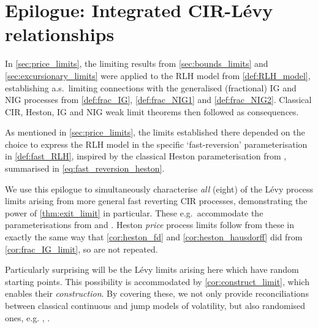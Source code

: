 \clearpage

\section*{\hypertarget{epilogue}{Epilogue: Integrated CIR-L\'evy relationships}}
\renewcommand\thesubsection{\thesection\Alph{subsection}}

\pagestyle{fancy}
\fancyhf{}
\renewcommand{\headrulewidth}{0pt}
\cfoot{\thepage}

In \autoref{sec:price_limits}, the limiting results from \autoref{sec:bounds_limits} and \autoref{sec:excursionary_limits} were applied to the RLH model from \autoref{def:RLH_model}, establishing a.s.~limiting connections with the generalised (fractional) IG and NIG processes from \autoref{def:frac_IG}, \autoref{def:frac_NIG1} and \autoref{def:frac_NIG2}. Classical CIR, Heston, IG and NIG weak limit theorems then followed as consequences.

As mentioned in \autoref{sec:price_limits}, the limits established there depended on the choice to express the RLH model in the specific `fast-reversion' parameterisation in \autoref{def:fast_RLH}, inspired by the classical Heston parameterisation from \cite{mechkov_2015}, summarised in \autoref{eq:fast_reversion_heston}.

We use this epilogue to simultaneously characterise \emph{all} (eight) of the L\'evy process limits arising from more general fast reverting CIR processes, demonstrating the power of \autoref{thm:exit_limit} in particular. These e.g.~accommodate the parameterisations from \cite{heston_1993} and \cite{fouque_2011}. Heston \emph{price} process limits follow from these in exactly the same way that \autoref{cor:heston_fd} and \autoref{cor:heston_hausdorff} did from \autoref{cor:frac_IG_limit}, so are not repeated.

Particularly surprising will be the L\'evy limits arising here which have random starting points. This possibility is accommodated by \autoref{cor:construct_limit}, which enables their \emph{construction}. By covering these, we not only provide reconciliations between classical continuous and jump models of volatility, but also randomised ones, e.g. \cite{mechkov_2016}, \cite{jacquier_2019}.

